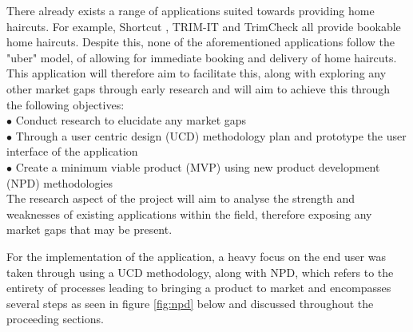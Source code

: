 \documentclass[12pt]{article}
\begin{document}
	There already exists a range of applications suited towards providing home haircuts. For example, Shortcut \cite{incShortcutInHomeHaircuts}, TRIM-IT\cite{TRIMITMobileBarbershopsa} and TrimCheck\cite{TrimCheckHomeHaircuts} all provide bookable home haircuts. Despite this, none of the aforementioned applications follow the "uber" model, of allowing for immediate booking and delivery of home haircuts. 
	\\
	
	This application will therefore aim to facilitate this, along with exploring any other market gaps through early research and will aim to achieve this through the following objectives:
	\\
	
	\noindent
	$\bullet$ Conduct research to elucidate any market gaps
	\\
	$\bullet$ Through a user centric design (UCD) methodology plan and prototype the user interface of the application
	\\
	$\bullet$ Create a minimum viable product (MVP) using new product development (NPD) methodologies
	\\
	
	The research aspect of the project will aim to analyse the strength and weaknesses of existing applications within the field, therefore exposing any market gaps that may be present. 
	
	For the implementation of the application, a heavy focus on the end user was taken through using a UCD methodology, along with NPD, which refers to the  entirety of processes leading to bringing a product to market and encompasses several steps as seen in figure \ref{fig:npd} below and discussed throughout the proceeding sections.
	\newline
	
\end{document}
